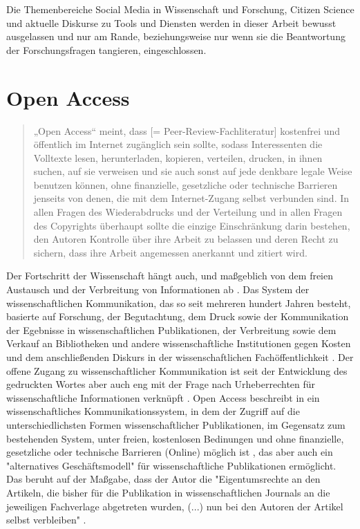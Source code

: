 Die Themenbereiche Social Media in Wissenschaft und Forschung, Citizen Science und aktuelle Diskurse zu Tools und Diensten werden in dieser Arbeit bewusst ausgelassen und nur am Rande, beziehungsweise nur wenn sie die Beantwortung der Forschungsfragen tangieren, eingeschlossen.

\section{Open Access} 

\begin{quote}
„Open Access“ meint, dass [= Peer-Review-Fachliteratur] kostenfrei und öffentlich im Internet zugänglich sein sollte, sodass Interessenten die Volltexte lesen, herunterladen, kopieren, verteilen, drucken, in ihnen suchen, auf sie verweisen und sie auch sonst auf jede denkbare legale Weise benutzen können, ohne finanzielle, gesetzliche oder technische Barrieren jenseits von denen, die mit dem Internet-Zugang selbst verbunden sind. In allen Fragen des Wiederabdrucks und der Verteilung und in allen Fragen des Copyrights überhaupt sollte die einzige Einschränkung darin bestehen, den Autoren Kontrolle über ihre Arbeit zu belassen und deren Recht zu sichern, dass ihre Arbeit angemessen anerkannt und zitiert wird.
\cite{boai_2012}
\end{quote}
Der Fortschritt der Wissenschaft hängt auch, und maßgeblich von dem freien Austausch und der Verbreitung von Informationen ab \cite{cite:11}. Das System der wissenschaftlichen Kommunikation, das so seit mehreren hundert Jahren besteht, basierte auf Forschung, der Begutachtung, dem Druck sowie der Kommunikation der Egebnisse in wissenschaftlichen Publikationen, der Verbreitung sowie dem Verkauf an Bibliotheken und andere wissenschaftliche Institutionen gegen Kosten \cite{cite:11a} und dem anschließenden Diskurs in der wissenschaftlichen Fachöffentlichkeit \cite{suchen}. Der offene Zugang zu wissenschaftlicher Kommunikation ist seit der Entwicklung des gedruckten Wortes aber auch eng mit der Frage nach Urheberrechten für wissenschaftliche Informationen verknüpft \cite{Case_2000}. Open Access beschreibt in ein wissenschaftliches Kommunikationssystem, in dem der Zugriff auf die unterschiedlichsten Formen wissenschaftlicher Publikationen, im Gegensatz zum bestehenden System, unter freien, kostenlosen Bedinungen und ohne finanzielle, gesetzliche oder technische Barrieren (Online) möglich ist \cite{WD_bundestag_2009}, das aber auch ein "alternatives Geschäftsmodell"\cite{lewis_2012_inevitability} für wissenschaftliche Publikationen ermöglicht. Das beruht auf der Maßgabe, dass der Autor die "Eigentumsrechte an den Artikeln, die bisher für die Publikation in wissenschaftlichen Journals an die jeweiligen Fachverlage abgetreten wurden, (...) nun bei den Autoren der Artikel selbst verbleiben" \cite{Hess_2006}. 

